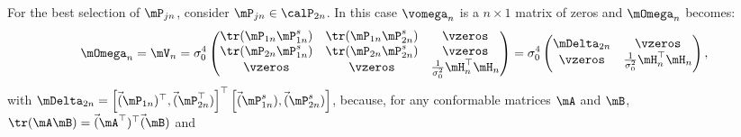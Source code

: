 For the best selection of $\mP_{jn}$, consider $\mP_{jn}\in \calP_{2n}$. In this case $\vomega_n$ is a $n\times 1$ matrix of zeros and $\mOmega_n$ becomes:
\begin{equation*}
\mOmega_n = \mV_n = \sigma_0^4
          \begin{pmatrix}
          \tr(\mP_{1n}\mP_{1n}^s) & \tr(\mP_{1n}\mP_{2n}^s) & \vzeros \\
          \tr(\mP_{2n}\mP_{1n}^s) & \tr(\mP_{2n}\mP_{2n}^s) & \vzeros \\
          \vzeros & \vzeros & \frac{1}{\sigma_0^2}\mH_n^{\top}\mH_n
          \end{pmatrix} = 
          \sigma_0^4\begin{pmatrix}
          \mDelta_{2n} & \vzeros \\
          \vzeros & \frac{1}{\sigma_0^2}\mH_n^{\top}\mH_n
          \end{pmatrix},
\end{equation*}
%
with $\mDelta_{2n} = \left[\vec(\mP_{1n})^\top, \vec(\mP_{2n}^\top)\right]^\top\left[\vec(\mP_{1n}^s), \vec(\mP_{2n}^s)\right]$, because, for any conformable matrices $\mA$ and $\mB$, $\tr(\mA\mB) = \vec(\mA^\top)^\top\vec(\mB)$ and
\footnotesize
